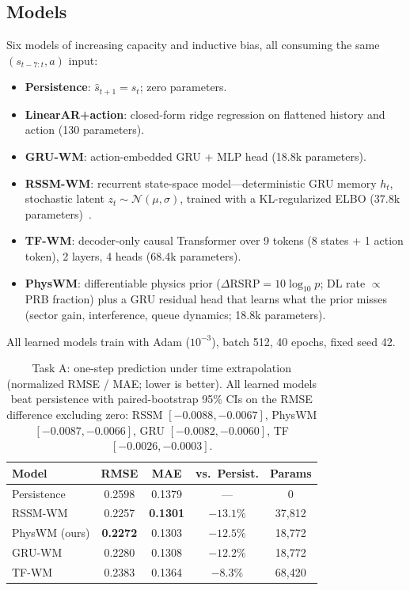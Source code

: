 \documentclass[10pt,conference]{IEEEtran}
\newcommand{\wm}{\textsc{GRU-WM}}
\begin{document}
\subsection{Models}
Six models of increasing capacity and inductive bias, all consuming the same $(s_{t-7:t}, a)$ input:
\begin{itemize}
\item \textbf{Persistence}: $\hat{s}_{t+1}=s_t$; zero parameters.
\item \textbf{LinearAR+action}: closed-form ridge regression on flattened history and action (130 parameters).
\item \textbf{GRU-WM}: action-embedded GRU + MLP head (18.8k parameters).
\item \textbf{RSSM-WM}: recurrent state-space model---deterministic GRU memory $h_t$, stochastic latent $z_t\!\sim\!\mathcal{N}(\mu,\sigma)$, trained with a KL-regularized ELBO (37.8k parameters)~\cite{hafner2019dream}.
\item \textbf{TF-WM}: decoder-only causal Transformer over 9 tokens (8 states + 1 action token), 2 layers, 4 heads (68.4k parameters).
\item \textbf{PhysWM}: differentiable physics prior ($\Delta\mathrm{RSRP}=10\log_{10}p$; DL rate $\propto$ PRB fraction) plus a GRU residual head that learns what the prior misses (sector gain, interference, queue dynamics; 18.8k parameters).
\end{itemize}
All learned models train with Adam ($10^{-3}$), batch 512, 40 epochs, fixed seed 42.

\begin{table}[t]
\centering
\caption{Task A: one-step prediction under time extrapolation (normalized RMSE / MAE; lower is better). All learned models beat persistence with paired-bootstrap 95\% CIs on the RMSE difference excluding zero: RSSM $[-0.0088,-0.0067]$, PhysWM $[-0.0087,-0.0066]$, GRU $[-0.0082,-0.0060]$, TF $[-0.0026,-0.0003]$.}
\label{tab:wm}
\small
\begin{tabular}{lcccc}
\toprule
Model & RMSE & MAE & vs.\ Persist. & Params \\
\midrule
Persistence & 0.2598 & 0.1379 & --- & 0 \\
RSSM-WM & 0.2257 & \textbf{0.1301} & $\mathbf{-13.1\%}$ & 37{,}812 \\
PhysWM (ours) & \textbf{0.2272} & 0.1303 & $-12.5\%$ & 18{,}772 \\
\wm{} & 0.2280 & 0.1308 & $-12.2\%$ & 18{,}772 \\
TF-WM & 0.2383 & 0.1364 & $-8.3\%$ & 68{,}420 \\
\bottomrule
\end{tabular}
\end{table}
\end{document}
